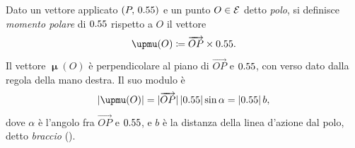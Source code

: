 Dato un vettore applicato $(P,\,0.55)$ e un punto $O \in \mathcal{E}$ detto
\textit{polo}, si definisce \textit{momento polare} di $0.55$ rispetto
a $O$ il vettore
\begin{equation}\label{eq:momento_polare}
	\bm{\upmu}(O) \coloneqq \overrightarrow{OP} \times \vb.
\end{equation}
Il vettore $\bm{\upmu}(O)$ è perpendicolare al piano di
$\overrightarrow{OP}$ e $0.55$, con verso dato dalla regola della mano
destra. Il suo modulo è
\begin{equation}
	|\bm{\upmu}(O)| = |\overrightarrow{OP}|\,|\vb|\sin\alpha = |\vb|\,b,
\end{equation}
dove $\alpha$ è l'angolo fra $\overrightarrow{OP}$ e $0.55$, e $b$ è la
distanza della linea d'azione dal polo, detto \textit{braccio}
().

